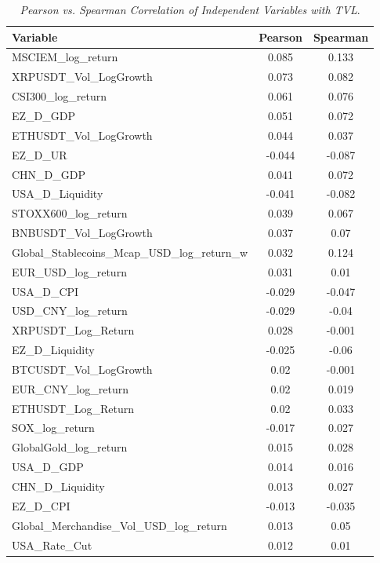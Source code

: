\begin{table}[ht]
  \centering
  \caption{\textit{Pearson vs. Spearman Correlation of Independent Variables with TVL}.}
  \label{tab:pear_spear_cor_tvl_2018_2025}
  \begin{tabular}{lcc}
    \toprule
    \textbf{Variable} & \textbf{Pearson} & \textbf{Spearman} \\ 
    \midrule
    MSCIEM\_log\_return & 0.085 & 0.133 \\ 
    XRPUSDT\_Vol\_LogGrowth & 0.073 & 0.082 \\ 
    CSI300\_log\_return & 0.061 & 0.076 \\ 
    EZ\_D\_GDP & 0.051 & 0.072 \\ 
    ETHUSDT\_Vol\_LogGrowth & 0.044 & 0.037 \\ 
    EZ\_D\_UR & -0.044 & -0.087 \\ 
    CHN\_D\_GDP & 0.041 & 0.072 \\ 
    USA\_D\_Liquidity & -0.041 & -0.082 \\ 
    STOXX600\_log\_return & 0.039 & 0.067 \\ 
    BNBUSDT\_Vol\_LogGrowth & 0.037 & 0.07 \\ 
    Global\_Stablecoins\_Mcap\_USD\_log\_return\_w & 0.032 & 0.124 \\ 
    EUR\_USD\_log\_return & 0.031 & 0.01 \\ 
    USA\_D\_CPI & -0.029 & -0.047 \\ 
    USD\_CNY\_log\_return & -0.029 & -0.04 \\ 
    XRPUSDT\_Log\_Return & 0.028 & -0.001 \\ 
    EZ\_D\_Liquidity & -0.025 & -0.06 \\ 
    BTCUSDT\_Vol\_LogGrowth & 0.02 & -0.001 \\ 
    EUR\_CNY\_log\_return & 0.02 & 0.019 \\ 
    ETHUSDT\_Log\_Return & 0.02 & 0.033 \\ 
    SOX\_log\_return & -0.017 & 0.027 \\ 
    GlobalGold\_log\_return & 0.015 & 0.028 \\ 
    USA\_D\_GDP & 0.014 & 0.016 \\ 
    CHN\_D\_Liquidity & 0.013 & 0.027 \\ 
    EZ\_D\_CPI & -0.013 & -0.035 \\ 
    Global\_Merchandise\_Vol\_USD\_log\_return & 0.013 & 0.05 \\ 
    USA\_Rate\_Cut & 0.012 & 0.01 \\ 

\end{tabular}
\end{table}
